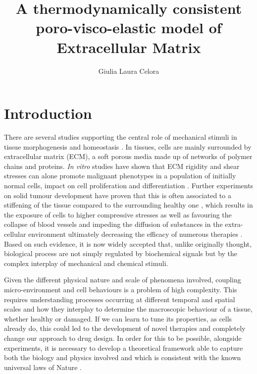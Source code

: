 \documentclass[runningheads]{llncs}
\begin{document}
%
\title{A thermodynamically consistent poro-visco-elastic model of Extracellular Matrix}
%
%
\author{Giulia Laura Celora}
%
%
%
\maketitle              %
%
\begin{abstract}

\end{abstract}
%
%
%
\section{Introduction}

There are several studies supporting the central role of mechanical stimuli in tissue morphogenesis and homeostasis \cite{ex1,ex2}. In tissues, cells are mainly surrounded by extracellular matrix (ECM), a soft porous media made up of  networks of polymer chains and proteins. \textit{In vitro} studies have shown that ECM rigidity and shear stresses can alone promote malignant phenotypes in a population of initially normal cells, impact on cell proliferation and differentiation \cite{ex3}. Further experiments on solid tumour development have proven that this is often associated to a stiffening of the tissue compared to the surrounding healthy one \cite{ex4}, which results in the exposure of cells to higher compressive stresses as well as favouring the collapse of blood vessels and impeding the diffusion of substances in the extra-cellular environment ultimately decreasing the efficacy of numerous therapies \cite{ecm2}. Based on such evidence, it is now widely accepted that, unlike originally thought, biological process are not simply regulated by biochemical signals but by the complex interplay of mechanical and chemical stimuli.
 
Given the different physical nature and scale of phenomena involved, coupling micro-environment and cell behaviours is a problem of high complexity. This requires understanding processes occurring at different temporal and spatial scales and how they interplay to determine the macroscopic behaviour of a tissue, whether healthy or damaged. If we can learn to tune its properties, as cells already do, this could led to the development of novel therapies and completely change our approach to  drug design. In order for this to be possible, alongside experiments, it is necessary to develop a theoretical framework able to capture both the biology and physics involved and which is consistent with the known universal laws of Nature \cite{NET}. 
\end{document}
